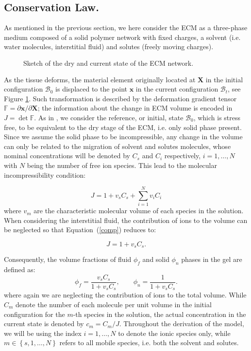 \documentclass[runningheads]{llncs}
\newcommand{\F}{\ensuremath{\mathbb{F}}}
\begin{document}
\subsection{Conservation Law.}
\label{conslaw}
As mentioned in the previous section, we here consider the ECM as a three-phase medium composed of a solid polymer network with fixed charges, a solvent (i.e. water molecules, interstitial fluid) and solutes (freely moving charges). 
\begin{figure}[h!]
	\centering
	\def\svgwidth{0.9\linewidth}
	
	\caption{Sketch of the dry and current state of the ECM network.}
	\label{Above}
\end{figure}

As the tissue deforms, the material element originally located at $\mathbf{X}$ in the initial configuration $\mathcal{B}_0$ is displaced to the point $\mathbf{x}$ in the current configuration $\mathcal{B}_t$, see Figure \ref{Above}. Such transformation is described by the deformation gradient tensor $\F= \partial \mathbf{x}/\partial \mathbf{X}$; the information about the change in ECM volume is encoded in $J= \det \F$. As in \cite{sarah}, we consider the reference, or initial, state $\mathcal{B}_0$, which is stress free, to be equivalent to the dry stage of the ECM, i.e. only solid phase present. Since we assume the solid phase to be incompressible, any change in the volume can only be related to the migration of solvent and solutes molecules, whose nominal concentrations will be denoted by $C_s$ and $C_i$ respectively, $i=1,\ldots,N$ with $N$ being the number of free ion species. This lead to the molecular incompressibility condition:

\begin{equation}
 J= 1 + v_s C_s +\sum\limits_{i=1}^{N} v_i C_i
 \label{comp}
\end{equation}
where $v_m$ are the characteristic molecular volume of each species in the solution. When considering the interstitial fluid, the contribution of ions to the volume can be neglected \cite{ecm1,ecm2} so that Equation~(\ref{comp}) reduces to:

\begin{equation}
J=1+v_s C_s.
\label{inc}
\end{equation} 

Consequently, the volume fractions of fluid $\phi_f$ and solid $\phi_n$ phases in the gel are defined as:
\begin{equation}
\phi_f = \frac{v_sC_s}{1+v_sC_s}, \qquad \phi_n = \frac{1}{1+v_sC_s}.
\end{equation}
where again we are neglecting the contribution of ions to the total volume.
While $C_m$ denote the number of each molecule per unit volume in the initial configuration for the $m$-th species in the solution, the actual concentration in the current state is denoted by $c_m=C_m/J$. Throughout the derivation of the model, we will be using the index $i=1,\ldots,N$ to denote the ionic species only, while $m\in\left\{s,1,\ldots,N\right\}$ refers to all mobile species, i.e. both the solvent and solutes.
\end{document}
